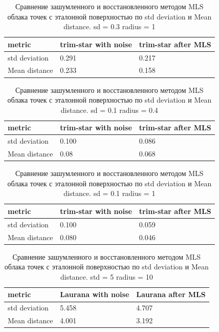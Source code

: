 \begin{table}[h!]
\centering
\begin{tabular}{|p{3cm} |p{2cm}| p{3cm} |}
    \hline
    metric & trim-star with noise & trim-star after MLS \\
    \hline\hline
    std deviation & 0.291 &  0.217 \\
    \hline
    Mean distance & 0.233 &   0.158 \\
    \hline
\end{tabular}
\caption{Сравнение зашумленного и восстановленного методом MLS облака точек с эталонной поверхностью по std deviation и Mean distance. sd = 0.3 radius = 1}
\label{table:1}
\end{table}

\begin{table}[h!]
\centering
\begin{tabular}{|p{3cm} |p{2cm}| p{3cm} |}
    \hline
    metric & trim-star with noise & trim-star after MLS \\
    \hline\hline
    std deviation & 0.100 &  0.086 \\
    \hline
    Mean distance & 0.08 &   0.068 \\
    \hline
\end{tabular}
\caption{Сравнение зашумленного и восстановленного методом MLS облака точек с эталонной поверхностью по std deviation и Mean distance. sd = 0.1 radius = 0.4}
\label{table:1}
\end{table}

\begin{table}[h!]
\centering
\begin{tabular}{|p{3cm} |p{2cm}| p{3cm} |}
    \hline
    metric & trim-star with noise & trim-star after MLS \\
    \hline\hline
    std deviation & 0.100 &  0.059 \\
    \hline
    Mean distance & 0.080 &   0.046 \\
    \hline
\end{tabular}
\caption{Сравнение зашумленного и восстановленного методом MLS облака точек с эталонной поверхностью по std deviation и Mean distance. sd = 0.1 radius = 1}
\label{table:1}
\end{table}


\begin{table}[h!]
\centering
\begin{tabular}{|p{3cm} |p{2cm}| p{3cm} |}
    \hline
    metric & Laurana with noise & Laurana after MLS \\
    \hline\hline
    std deviation & 5.458 &  4.707 \\
    \hline
    Mean distance & 4.001 &   3.192 \\
    \hline
\end{tabular}
\caption{Сравнение зашумленного и восстановленного методом MLS облака точек с эталонной поверхностью по std deviation и Mean distance. std = 5 radius = 10}
\label{table:1}
\end{table}

